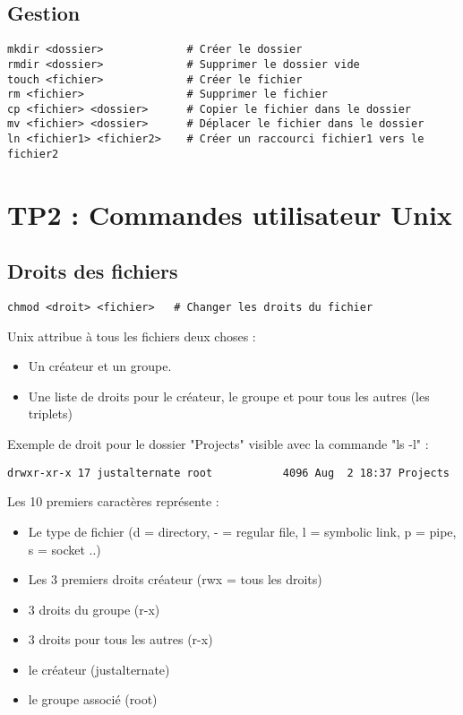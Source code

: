 \documentclass{article}
\begin{document}
\subsection{Gestion}
\begin{verbatim}
mkdir <dossier>             # Créer le dossier
rmdir <dossier>             # Supprimer le dossier vide
touch <fichier>             # Créer le fichier
rm <fichier>                # Supprimer le fichier
cp <fichier> <dossier>      # Copier le fichier dans le dossier
mv <fichier> <dossier>      # Déplacer le fichier dans le dossier
ln <fichier1> <fichier2>    # Créer un raccourci fichier1 vers le fichier2 
\end{verbatim}

\section{TP2 : Commandes utilisateur Unix}

\subsection{Droits des fichiers}

\begin{verbatim}
chmod <droit> <fichier>   # Changer les droits du fichier
\end{verbatim}

Unix attribue à tous les fichiers deux choses :

\begin{itemize}
  \item Un créateur et un groupe.
  \item Une liste de droits pour le créateur, le groupe et pour tous les autres (les triplets)
\end{itemize}

Exemple de droit pour le dossier "Projects" visible avec la commande "ls -l" : 
\begin{verbatim}
drwxr-xr-x 17 justalternate root           4096 Aug  2 18:37 Projects
\end{verbatim}
Les 10 premiers caractères représente :
\begin{itemize}
  \item Le type de fichier (d = directory, - = regular file, l = symbolic link, p = pipe, s = socket ..)
  \item Les 3 premiers droits créateur (rwx = tous les droits)
  \item 3 droits du groupe (r-x)
  \item 3 droits pour tous les autres (r-x)
  \item le créateur (justalternate)
  \item le groupe associé (root)
\end{itemize}
\end{document}
